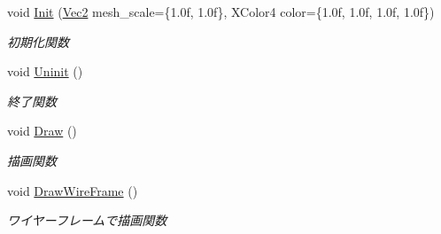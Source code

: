 \begin{DoxyCompactItemize}
void \mbox{\hyperlink{class_plane_polygon_ace07dfd794f3f2b4fbd1fe4dea3cca96}{Init}} (\mbox{\hyperlink{_vector3_d_8h_a5ef6e95dfc5f9d3820b71772d99bbc25}{Vec2}} mesh\+\_\+scale=\{1.\+0f, 1.\+0f\}, X\+Color4 color=\{1.\+0f, 1.\+0f, 1.\+0f, 1.\+0f\})
\begin{DoxyCompactList}\small\item\em 初期化関数 \end{DoxyCompactList}\item 
void \mbox{\hyperlink{class_plane_polygon_aaf0e9bf23d298371de64bfa4ab76c808}{Uninit}} ()
\begin{DoxyCompactList}\small\item\em 終了関数 \end{DoxyCompactList}\item 
void \mbox{\hyperlink{class_plane_polygon_a2f20691ee0feee4fa428f5d017d7062a}{Draw}} ()
\begin{DoxyCompactList}\small\item\em 描画関数 \end{DoxyCompactList}\item 
void \mbox{\hyperlink{class_plane_polygon_a28ed1c8f4ca971b1a82e8c6567855779}{Draw\+Wire\+Frame}} ()
\begin{DoxyCompactList}\small\item\em ワイヤーフレームで描画関数 \end{DoxyCompactList}\end{DoxyCompactItemize}
